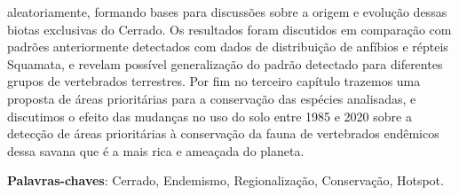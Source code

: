 \documentclass[12pt,openright,oneside,a4paper,english]{abntex2}
\begin{document}
\begin{resumo}[Resumo]
aleatoriamente, formando bases para discussões sobre a origem e evolução dessas biotas exclusivas do Cerrado. Os resultados foram discutidos em comparação com padrões anteriormente detectados com dados de distribuição de anfíbios e répteis Squamata, e revelam possível generalização do padrão detectado para diferentes grupos de vertebrados terrestres. Por fim no terceiro capítulo trazemos uma proposta de áreas prioritárias para a conservação das espécies analisadas, e discutimos o efeito das mudanças no uso do solo entre 1985 e 2020 sobre a detecção de áreas prioritárias à conservação da fauna de vertebrados endêmicos dessa savana que é a mais rica e ameaçada do planeta.
	\vspace{\onelineskip}
	\noindent
	
	\textbf{Palavras-chaves}: Cerrado, Endemismo, Regionalização, Conservação, Hotspot.
\end{resumo}
\end{document}
